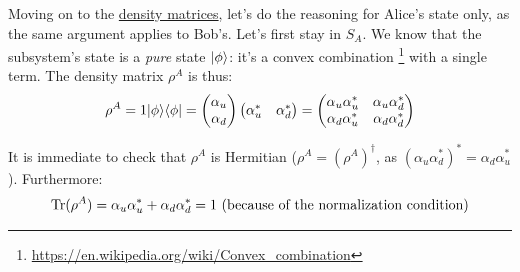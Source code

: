 \documentclass[solutions.tex]{subfiles}
\begin{document}
Moving on to the \underline{density matrices}, let's do the reasoning
for Alice's state only, as the same argument applies to Bob's. Let's
first stay in $S_A$. We know that the subsystem's state
is a \textit{pure} state $|\phi\rangle$: it's a convex combination%
\footnote{\url{https://en.wikipedia.org/wiki/Convex\_combination}} with
a single term. The density matrix $\rho^A$ is thus:
\[
	\rho^A = 1|\phi\rangle\langle \phi| = \begin{pmatrix}
		\alpha_u \\
		\alpha_d \\
	\end{pmatrix}\begin{pmatrix}
		\alpha_u^* & \alpha_d^* \\
	\end{pmatrix} = \begin{pmatrix}
		\alpha_u\alpha_u^* & \alpha_u\alpha_d^* \\
		\alpha_d\alpha_u^* & \alpha_d\alpha_d^* \\
	\end{pmatrix}
\]

It is immediate to check that $\rho^A$ is Hermitian ($\rho^A = (\rho^A)^\dagger$,
as $(\alpha_u\alpha_d^*)^* = \alpha_d\alpha_u^*$).
Furthermore:
\[
	\text{Tr}(\rho^A) = \alpha_u\alpha_u^* + \alpha_d\alpha_d^* = 1
	\text{ (because of the normalization condition)}
\]
\end{document}
